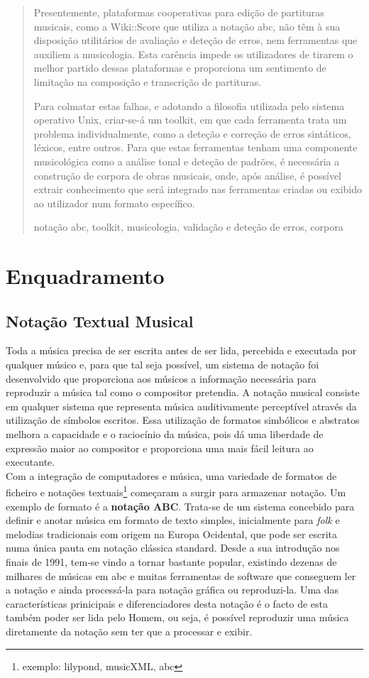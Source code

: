 \documentclass[runningheads,a4paper]{llncs}
\newcommand{\keywords}[1]{\par\addvspace\baselineskip
\newcommand{\tab}{\hspace*{2em}}
\noindent\keywordname\enspace\ignorespaces#1}
\begin{document}
\begin{abstract}
Presentemente, plataformas cooperativas para edição de partituras musicais, como a Wiki::Score que
utiliza a notação abc, não têm à sua disposição utilitários de avaliação e deteção de erros, nem
ferramentas que auxiliem a musicologia. Esta carência impede os utilizadores de tirarem o melhor
partido dessas plataformas e proporciona um sentimento de limitação na composição e transcrição de
partituras.

Para colmatar estas falhas, e adotando a filosofia utilizada pelo sistema operativo Unix, criar-se-á
um toolkit, em que cada ferramenta trata um problema individualmente, como a deteção e correção de
erros sintáticos, léxicos, entre outros. Para que estas ferramentas tenham uma componente
musicológica como a análise tonal e deteção de padrões, é necessária a construção de corpora de
obras musicais, onde, após análise, é possível extrair conhecimento que será integrado nas
ferramentas criadas ou exibido ao utilizador num formato específico.
\keywords{notação abc, toolkit, musicologia, validação e deteção de erros, corpora}
\end{abstract}


\section{Enquadramento}

\subsection{Notação Textual Musical}
Toda a música precisa de ser escrita antes de ser lida, percebida e executada por qualquer músico e,
para que tal seja possível, um sistema de notação foi desenvolvido que proporciona aos músicos a
informação necessária para reproduzir a música tal como o compositor pretendia. A notação musical
consiste em qualquer sistema que representa música auditivamente perceptível através da utilização
de símbolos escritos. Essa utilização de formatos simbólicos e abstratos melhora a capacidade e o
raciocínio da música, pois dá uma liberdade de expressão maior ao compositor e proporciona uma mais
fácil leitura ao executante. \\
Com a integração de computadores e música, uma variedade de formatos de ficheiro e notações
textuais\footnote{exemplo: lilypond, musicXML, abc} começaram a surgir para armazenar notação. Um
exemplo de formato é a \textbf{notação ABC}. Trata-se de um sistema concebido para definir e anotar
música em formato de texto simples, inicialmente para \textit{folk} e melodias tradicionais com
origem na Europa Ocidental, que pode ser escrita numa única pauta em notação clássica standard.
Desde a sua introdução nos finais de 1991, tem-se vindo a tornar bastante popular, existindo dezenas
de milhares de músicas em abc e muitas ferramentas de software que conseguem ler a notação e ainda
processá-la para notação gráfica ou reproduzi-la. Uma das características prinicipais e
diferenciadores desta notação é o facto de esta também poder ser lida pelo Homem, ou seja, é
possível reproduzir uma música diretamente da notação sem ter que a processar e exibir.
\end{document}
